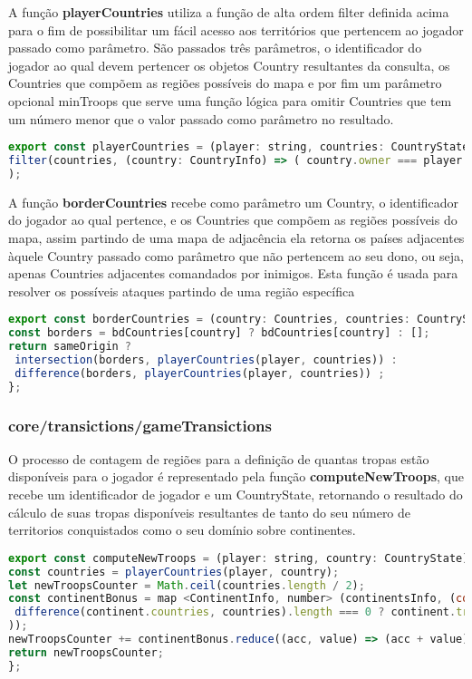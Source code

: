 \documentclass[rel_mlp]{iiufrgs}
\begin{document}
A função \textbf{playerCountries} utiliza a função de alta ordem filter definida acima para o fim de possibilitar um fácil acesso aos territórios que pertencem ao jogador passado como parâmetro. São passados três parâmetros, o identificador do jogador ao qual devem pertencer os objetos Country resultantes da consulta, os Countries que compõem as regiões possíveis do mapa e por fim um parâmetro opcional minTroops que serve uma função lógica para omitir Countries que tem um número menor que o valor passado como parâmetro no resultado.

\begin{lstlisting}[language=JavaScript]
export const playerCountries = (player: string, countries: CountryState, minTroops: number = 0) => (
filter(countries, (country: CountryInfo) => ( country.owner === player && country.troops > minTroops))
);
\end{lstlisting}

A função \textbf{borderCountries} recebe como parâmetro um Country, o identificador do jogador ao qual pertence, e os Countries que compõem as regiões possíveis do mapa, assim partindo de uma mapa de adjacência ela retorna os países adjacentes àquele Country passado como parâmetro que não pertencem ao seu dono, ou seja, apenas Countries adjacentes comandados por inimigos. Esta função é usada para resolver os possíveis ataques partindo de uma região específica
\begin{lstlisting}[language = JavaScript]
export const borderCountries = (country: Countries, countries: CountryState, player: string, sameOrigin: boolean = true) => {
const borders = bdCountries[country] ? bdCountries[country] : [];
return sameOrigin ?
 intersection(borders, playerCountries(player, countries)) :
 difference(borders, playerCountries(player, countries)) ;
};
\end{lstlisting}


\subsubsection{core/transictions/gameTransictions}

O processo de contagem de regiões para a definição de quantas tropas estão disponíveis para o jogador é representado pela função \textbf{computeNewTroops}, que recebe um identificador de jogador e um CountryState, retornando o resultado do cálculo de suas tropas disponíveis resultantes de tanto do seu número de territorios conquistados como o seu domínio sobre continentes.
\begin{lstlisting}[language=JavaScript]
export const computeNewTroops = (player: string, country: CountryState) => {
const countries = playerCountries(player, country);
let newTroopsCounter = Math.ceil(countries.length / 2);
const continentBonus = map <ContinentInfo, number> (continentsInfo, (continent: ContinentInfo) => (
 difference(continent.countries, countries).length === 0 ? continent.troopsBonus : 0
));
newTroopsCounter += continentBonus.reduce((acc, value) => (acc + value), 0);
return newTroopsCounter;
};
\end{lstlisting}
\end{document}
